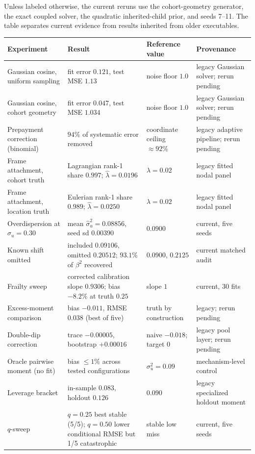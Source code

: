 \documentclass[11pt]{article}
\begin{document}
Unless labeled otherwise, the current reruns use the cohort-geometry generator, the exact
coupled solver, the quadratic inherited-child prior, and seeds 7--11. The table separates
current evidence from results inherited from older executables.

\begin{center}
\small
\begin{tabularx}{\textwidth}{@{}p{}X p{}p{}@{}}
\toprule
Experiment & Result & Reference value & Provenance\\
\midrule
Gaussian cosine, uniform sampling & fit error $0.121$, test MSE $1.13$ & noise floor $1.0$ & legacy Gaussian solver; rerun pending\\
Gaussian cosine, cohort geometry & fit error $0.047$, test MSE $1.034$ & noise floor $1.0$ & legacy Gaussian solver; rerun pending\\
Prepayment correction (binomial) & $94\%$ of systematic error removed & coordinate ceiling $\approx92\%$ & legacy adaptive pipeline; rerun pending\\
Frame attachment, cohort truth & Lagrangian rank-1 share $0.997$; $\hat\lambda=0.0196$ & $\lambda=0.02$ & legacy fitted nodal panel\\
Frame attachment, location truth & Eulerian rank-1 share $0.989$; $\hat\lambda=0.0250$ & $\lambda=0.02$ & legacy fitted nodal panel\\
Overdispersion at $\sigma_u=0.30$ & mean $\hat\sigma_u^2=0.08856$, seed sd $0.00390$ & $0.0900$ & current, five seeds\\
Known shift omitted & included $0.09106$, omitted $0.20512$; $93.1\%$ of $\beta^2$ recovered & $0.0900$, $0.2125$ & current matched audit\\
Frailty sweep & corrected calibration slope $0.9306$; bias $-8.2\%$ at truth $0.25$ & slope $1$ & current, 30 fits\\
Excess-moment comparison & bias $-0.011$, RMSE $0.038$ (best of five) & truth by construction & legacy; rerun pending\\
Double-dip correction & trace $-0.00005$, bootstrap $+0.00016$ & naive $-0.018$; target $0$ & legacy pool layer; rerun pending\\
Oracle pairwise moment (no fit) & bias $\le1\%$ across tested configurations & $\sigma_u^2=0.09$ & mechanism-level control\\
Leverage bracket & in-sample $0.083$, holdout $0.126$ & $0.090$ & legacy specialized holdout moment\\
$q$-sweep & $q=0.25$ best stable (5/5); $q=0.50$ lower conditional RMSE but 1/5 catastrophic & stable low miss & current, five seeds\\
\bottomrule
\end{tabularx}
\end{center}
\normalsize
\end{document}
